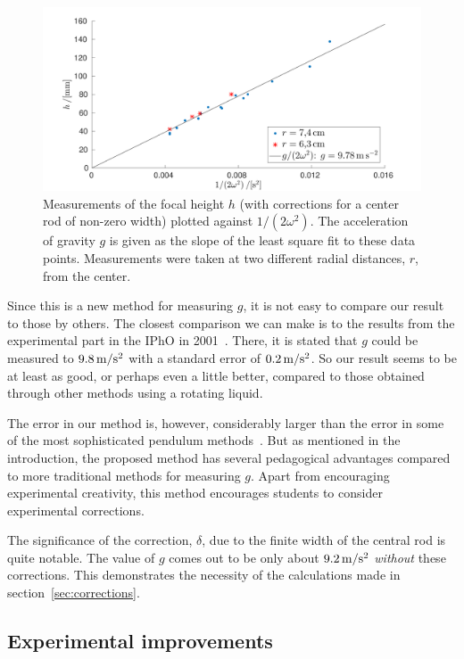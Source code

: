 \documentclass[12pt, a4paper, twocolumn]{article}
\begin{document}
\begin{figure}\centering 
\includegraphics[width=12cm]{fig5_data.pdf}
\caption{
Measurements of the focal height $h$ (with corrections for a center rod of non-zero width) plotted against $1/(2\omega^2)$. The acceleration of gravity $g$ is given as the slope of the least square fit to these data points. Measurements were taken at two different radial distances, $r$, from the center.}
\label{fig:data} 
\end{figure}

Since this is a new method for measuring $g$, it is not easy to compare our result to those by others. The closest comparison we can make is to the results from the experimental part in the IPhO in 2001~\cite{IPhO2001}. There, it is stated that $g$ could be measured to $\unit[9.8]{m/s^2}$ with a standard error of $\unit[0.2]{m/s^2}$. So our result seems to be at least as good, or perhaps even a little better, compared to those obtained through other methods using a rotating liquid. 

The error in our method is, however, considerably larger than the error in some of the most sophisticated pendulum methods~\cite{Candela2001}. But as mentioned in the introduction, the proposed method has several pedagogical advantages compared to more traditional methods for measuring $g$. Apart from encouraging experimental creativity, this method encourages students to consider experimental corrections. 

The significance of the correction, $\delta$, due to the finite width of the central rod is quite notable. The value of $g$ comes out to be only about $\unit[9.2]{m/s^2}$ \emph{without} these corrections. This demonstrates the necessity of the calculations made in section~\ref{sec:corrections}. 

\subsection{Experimental improvements}
\end{document}
